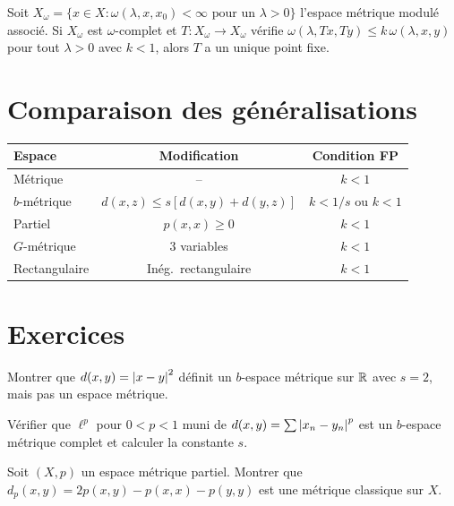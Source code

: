\begin{theoreme}
Soit $X_\omega = \{x \in X : \omega(\lambda, x, x_0) < \infty \text{ pour un } \lambda > 0\}$
l'espace m\'etrique modul\'e associ\'e. Si $X_\omega$ est $\omega$-complet et
$T : X_\omega \to X_\omega$ v\'erifie
$\omega(\lambda, Tx, Ty) \leq k \, \omega(\lambda, x, y)$ pour tout $\lambda > 0$
avec $k < 1$, alors $T$ a un unique point fixe.
\end{theoreme}

\section{Comparaison des g\'en\'eralisations}

\begin{formules}[title=\textbf{Synth\`ese des espaces g\'en\'eralis\'es}]
\begin{center}
\renewcommand{\arraystretch}{1.4}
\begin{tabular}{|l|c|c|}
\hline
\textbf{Espace} & \textbf{Modification} & \textbf{Condition FP} \\
\hline
M\'etrique & -- & $k < 1$ \\
$b$-m\'etrique & $d(x,z) \leq s[d(x,y)+d(y,z)]$ & $k < 1/s$ ou $k < 1$ \\
Partiel & $p(x,x) \geq 0$ & $k < 1$ \\
$G$-m\'etrique & 3 variables & $k < 1$ \\
Rectangulaire & In\'eg.\ rectangulaire & $k < 1$ \\
\hline
\end{tabular}
\end{center}
\end{formules}

\section{Exercices}

\begin{exercice}
Montrer que $d(x,y) = \left| x - y \right|^2$ d\'efinit un $b$-espace m\'etrique sur $\mathbb{R}$
avec $s = 2$, mais pas un espace m\'etrique.
\end{exercice}

\begin{exercice}
V\'erifier que $\ell^p$ pour $0 < p < 1$ muni de $d(x,y) = \sum \left| x_n - y_n \right|^p$
est un $b$-espace m\'etrique complet et calculer la constante $s$.
\end{exercice}

\begin{exercice}
Soit $(X, p)$ un espace m\'etrique partiel. Montrer que
$d_p(x,y) = 2p(x,y) - p(x,x) - p(y,y)$ est une m\'etrique classique sur $X$.
\end{exercice}

